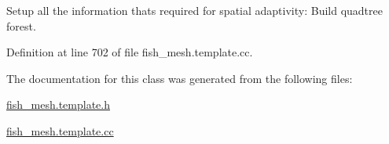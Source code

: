 Setup all the information that\textquotesingle{}s required for spatial adaptivity\+: Build quadtree forest. 

Definition at line 702 of file fish\+\_\+mesh.\+template.\+cc.



The documentation for this class was generated from the following files\+:\begin{DoxyCompactItemize}
\item 
\hyperlink{fish__mesh_8template_8h}{fish\+\_\+mesh.\+template.\+h}\item 
\hyperlink{fish__mesh_8template_8cc}{fish\+\_\+mesh.\+template.\+cc}\end{DoxyCompactItemize}
